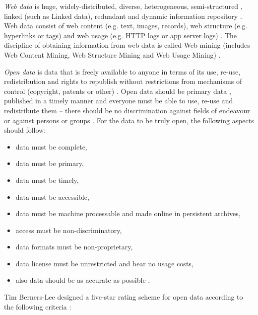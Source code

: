				\textit{Web data} is huge, widely-distributed, diverse, heterogeneous, semi-structured , linked (such as Linked data), redundant and dynamic information repository \cite{Aggarwal2015}. Web data consist of web content (e.g. text, images, records), web structure (e.g. hyperlinks or tags) and web usage (e.g. HTTP logs or app server logs) \cite{Aggarwal2015}. The discipline of obtaining information from web data is called Web mining (includes Web Content Mining, Web Structure Mining and Web Usage Mining) \cite{Aggarwal2015}.
				
				\textit{Open data} is data that is freely available to anyone in terms of its use, re-use, redistribution and rights to republish without restrictions from mechanisms of control (copyright, patents or other) \cite{Foundation2019}. Open data should be primary data , published in a timely manner and everyone must be able to use, re-use and redistribute them -- there should be no discrimination against fields of endeavour or against persons or groups \cite{Foundation2019}. For the data to be truly open, the following aspects should follow:
				\begin{itemize}
					\item data must be complete,
					\item data must be primary,
					\item data must be timely,
					\item data must be accessible,
					\item data must be machine processable and made online in persistent archives,
					\item access must be non-discriminatory,
					\item data formats must be non-proprietary,
					\item data license must be unrestricted and bear no usage costs,
					\item also data should be as accurate as possible \cite{Charalabidis2018}.
				\end{itemize}
				
				Tim Berners-Lee designed a five-star rating scheme for open data according to the following criteria \cite{Heath2011}\cite{Hausenblas2012}:
			
